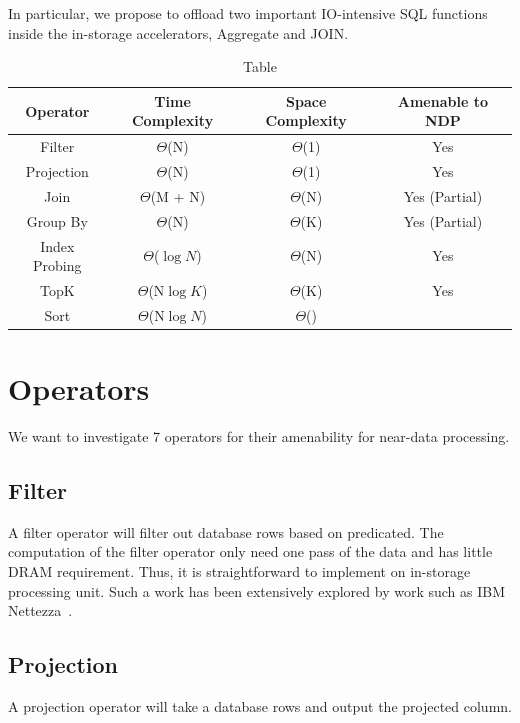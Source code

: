\documentclass{article}
\begin{document}
In particular, we propose to offload two important IO-intensive SQL functions inside the in-storage accelerators, Aggregate and JOIN.



\begin{table}
\centering 
\begin{tabular}{ |c|c|c|c| } 
 \hline
 Operator       & Time Complexity & Space Complexity  & Amenable to NDP \\ \hline
 Filter         & $\Theta$(N)     & $\Theta$(1)       & Yes             \\ \hline
 Projection     & $\Theta$(N)     & $\Theta$(1)       & Yes             \\ \hline
 Join           & $\Theta$(M + N) & $\Theta$(N)       & Yes (Partial)   \\ \hline
 Group By       & $\Theta$(N)     & $\Theta$(K)       & Yes (Partial)   \\ \hline
 Index Probing  & $\Theta$($\log{N}$) & $\Theta$(N)   & Yes             \\ \hline
 TopK           & $\Theta$(N$\log{K}$) & $\Theta$(K)  & Yes             \\ \hline
 Sort           & $\Theta$(N$\log{N}$) & $\Theta$()   & \\

 \hline
\end{tabular}
\caption{Table}
\end{table}

\section{Operators}
We want to investigate 7 operators for their amenability for near-data processing.
\subsection{Filter}
A filter operator will filter out database rows based on predicated.
The computation of the filter operator only need one pass of the data and has little DRAM requirement.
Thus, it is straightforward to implement on in-storage processing unit.
Such a work has been extensively explored by work such as IBM Nettezza~\cite{netezza}.

\subsection{Projection}
A projection operator will take a database rows and output the projected column. 
\end{document}

